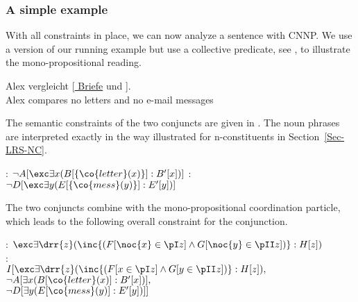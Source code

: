 \documentclass[output=paper]{langsci/langscibook}
\begin{document}

\subsubsection{A simple example}
\label{Sec-AnalyisSimpleExample}

With all constraints in place, we can now analyze a sentence with CNNP. We use a version of our running example but use a collective predicate, see , to illustrate the mono-propositional reading.

\ea \label{ex-brief-mail-ana}
\gll Alex vergleicht [\underline{ Briefe} und ].\\
Alex compares {\hphantom{[}no letters} and {no {e-mail messages}}\\
\z 

The semantic constraints of the two conjuncts are given in . 
The noun phrases are interpreted exactly in the way illustrated for n-constituents in Section~\ref{Sec-LRS-NC}.

\ea \label{ex-brief-mail-conj}
\begin{xlist}
\ex
{}: $\lnot A[\exc\exists x (B[\{\co{letter}(x)\}]: B'[x])]$
\ex
{}: $\lnot D[\exc\exists y (E[\{\co{mess}(y)\}]: E'[y])]$
\end{xlist}
\z 

The two conjuncts combine with the mono-propositional coordination particle, which leads to the following overall constraint for the conjunction.

\ea \label{ex-brief-mail-coord}
\begin{xlist}
\ex
{}: $\exc \exists \drr{z} (\inc{(F[\noc{x} \in \pI z] \land G[\noc{y} \in \pII z])} : H[z])$\\
\ex {}:\\
\qquad $I[
\exc \exists \drr{z} (\inc{(F[x \in \pI z] \land G[y \in \pII z])} : H[z]),$
\qquad $\lnot A[\exists x (B[\co{letter}(x)]: B'[x])],$\\
\qquad $\lnot D[\exists y (E[\co{mess}(y)]: E'[y])]
]$
\end{xlist}
\z 
\end{document}
